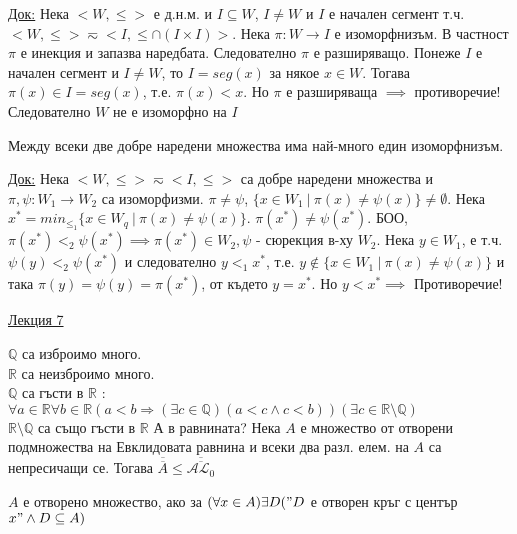 \documentclass[fleqn, titlepage, 12pt]{report}
\begin{document}
\underline{Док:} Нека $ <W,\leq> $ е д.н.м. и $ I \subseteq W $, $ I \neq W $ и $ I $ е начален сегмент т.ч.\\
$ <W, \leq> \eqsim <I, \leq \cap (I \times  I) > $.
Нека $ \pi : W \rightarrow I $ е изоморфнизъм. В частност $ \pi $ е инекция и запазва наредбата. Следователно $ \pi $
е разширяващо. Понеже $ I $ е начален сегмент и $ I \neq W $, то $ I = seg(x) $ за някое $ x \in W $. Тогава
$ \pi(x) \in I = seg(x) $, т.е. $ \pi(x) < x $. Но $ \pi $ е разширяваща $ \implies $ противоречие! Следователно
$ W $ не е изоморфно на $ I $
\bigbreak

 Между всеки две добре наредени множества има най-много един изоморфнизъм.
\bigbreak

\underline{Док:} Нека $ <W, \leq> \eqsim <I, \leq> $ са добре наредени множества и $ \pi, \psi : W_1 \rightarrow W_2 $
са изоморфизми. $ \pi \neq \psi $, $ \{x \in W_1\ |\ \pi(x) \neq \psi(x)\} \neq \emptyset $.
Нека $ x^* = min_{\leq_1} \{x \in W_q\ |\ \pi(x) \neq \psi(x)\}$. $ \pi(x^*) \neq \psi(x^*) $.
БОО, $ \pi(x^*) <_2 \psi(x^*) \implies \pi(x^*) \in W_2, \psi$ - сюрекция в-ху $ W_2 $. Нека $ y \in W_1  $,
е т.ч. $ \psi(y) <_2 \psi(x^*) $ и следователно $ y <_1 x^* $, т.е. $ y \notin \{x \in W_1\ |\ \pi(x) \neq \psi(x)\} $
и така $ \pi(y) = \psi(y) = \pi(x^*) $, от където $ y = x^* $. Но $ y < x^* \implies$  Противоречие!

\clearpage
\begin{center}
  \underline{\huge\normalfont Лекция 7}
\end{center}
\bigbreak
$\mathbb{Q}$ са изброимо много.\\
$\mathbb{R}$ са неизброимо много.\\
$\mathbb{Q}$ са гъсти в $\mathbb{R}$ : $\forall{a \in \mathbb{R}}\forall{b \in \mathbb{R}}(a < b \Rightarrow 
(\exists{c \in \mathbb{Q}})(a < c \land c < b))(\exists{c \in \mathbb{R \setminus Q}})$\\
$\mathbb{R \setminus Q}$ са също гъсти в $\mathbb{R}$
\bigbreak
А в равнината? Нека $ A $ е множество от отворени подмножества на Евклидовата равнина и всеки два разл. елем. на $ A $
са непресичащи се. Тогава $ \overline{\overline{A}} \leq \overline{\overline{\mathcal{AL}_0}} $

\bigbreak
{}
$ A $ е отворено множество, ако за
$ (\forall{x \in A}) \exists{D}("D$ е отворен кръг с център  $x" \land D \subseteq A) $
\bigbreak
\end{document}
